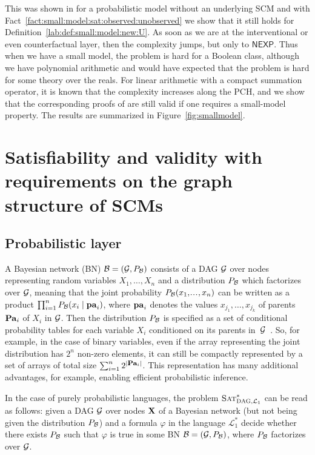 \documentclass[a4paper,UKenglish,cleveref, autoref, thm-restate]{lipics-v2021}
\newcommand{\compactEquals}[1]{\let\IsInPP=1#1\let\IsInPP=\relax}
\newcommand{\NEXP}{\ensuremath{\mathsf{NEXP}}}
\newcommand{\cL}{{\mathcal L}}
\newcommand{\bX}{{\bf X}}
\newcommand{\cB}{{\cal B}}
\newcommand{\cG}{{\cal G}}
\newcommand{\pa}{{\bf pa}}
\newcommand{\Pa}{{\bf Pa}}
\def\Lprobstar{\cL^{*}_{1}}
\newcommand{\SATprobstargraph}{\mbox{\sc Sat}^{*}_{\mbox{\scriptsize\sc DAG}, {\cL_1}}}
\newcommand\myldots{\!\makebox[1em][c]{.\hfil.\hfil.}}
\begin{document}
This was shown in \citep{blaser2024existential} for a probabilistic model without an underlying SCM and with Fact~\ref{fact:small:model:sat:observed:unobserved} we show that it still holds for Definition~\ref{lab:def:small:model:new:U}.
As soon as we are at the interventional or even counterfactual layer, then the complexity jumps, but only to $\NEXP$. Thus when we have a small model, the problem is hard for a Boolean class, although we have polynomial arithmetic and would have expected that the problem is hard for some theory over the reals.
For linear arithmetic with a compact summation operator, it is known that the complexity increases along the PCH, and we show that the corresponding proofs of \citep{doerflerICLR2025} are still valid if one requires a small-model property. 
The results are summarized in Figure~\ref{fig:smallmodel}.






\section{Satisfiability and validity with requirements on the graph structure of SCMs}
\label{sec:given:DAG:structure}



\subsection{Probabilistic layer}
\label{sec:given:DAG:structure:BNs}
A Bayesian network (BN) $\cB=(\cG,P_{\cB})$ consists of a DAG $\cG$ over nodes representing random variables $X_1,\ldots,X_n$ and a distribution $P_{\cB}$ which factorizes over $\cG$, meaning that the joint probability $\compactEquals{P_{\cB}(x_1,\myldots,x_n)}$ can be written as a product $\prod_{i=1}^n  \compactEquals{P_{\cB}(x_i\mid \pa_i)}$, where $\pa_i$ denotes the values $x_{j_1},\ldots,x_{j_k}$ of parents  $\Pa_i$ of $X_i$ in $\cG$. Then the distribution $P_{\cB}$ is specified as a set of conditional probability tables for each 
variable $X_i$ conditioned on its parents in~$\cG$~\cite{koller2009probabilistic}. So, for example, in the case of binary variables, even if the array representing the joint distribution has $2^n$ non-zero elements, it can still be compactly represented by a set of arrays of total size $\sum_{i=1}^n 2^{|\mbox{\footnotesize \Pa}_{i}|}$. This representation has many additional advantages, for example, enabling efficient probabilistic inference.

In the case of purely probabilistic languages, the problem $\SATprobstargraph$ can be read as follows:
given a DAG $\cG$ over nodes $\bX$ of a Bayesian network (but not being given the distribution $P_{\cB}$) and a formula $\varphi$ 
in the language $\Lprobstar$ decide whether there exists $P_{\cB}$ such that $\varphi$
is true in some BN $\cB=(\cG,P_{\cB})$, where $P_{\cB}$ factorizes over $\cG$.
\end{document}
